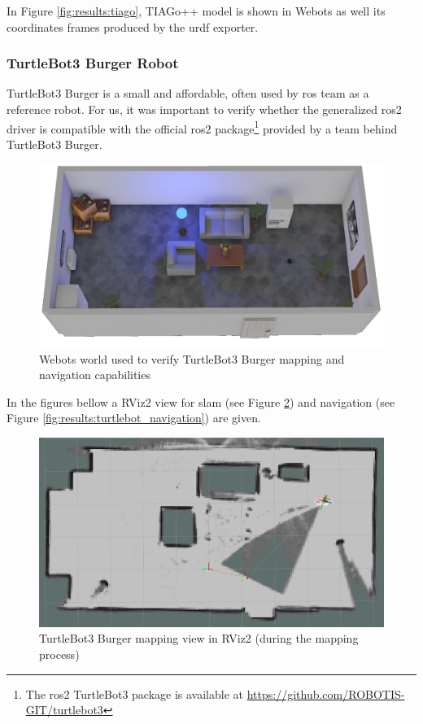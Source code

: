 In Figure \ref{fig:results:tiago}, TIAGo++ model is shown in Webots as well its coordinates frames produced by the \ac{urdf} exporter.

\subsubsection{TurtleBot3 Burger Robot}

TurtleBot3 Burger is a small and affordable, often used by \ac{ros} team as a reference robot.
For us, it was important to verify whether the generalized \ac{ros2} driver is compatible with
the official \ac{ros2} package\footnote{The \ac{ros2} TurtleBot3 package is available at \url{https://github.com/ROBOTIS-GIT/turtlebot3}} provided by a team behind TurtleBot3 Burger.

\begin{figure}[H]
    \centering
    \includegraphics[width=\textwidth]{./results/figures/turtlebot_webots}
    \caption{Webots world used to verify TurtleBot3 Burger mapping and navigation capabilities}
    \label{fig:results:turtlebot_webots}
\end{figure}

In the figures bellow a RViz2 view for \ac{slam} (see Figure \ref{fig:results:turtlebot_mapping}) and navigation (see Figure \ref{fig:results:turtlebot_navigation}) are given.

\begin{figure}[H]
    \centering
    \includegraphics[width=\textwidth]{./results/figures/turtlebot_mapping}
    \caption[TurtleBot3 Burger mapping view in RViz2]{TurtleBot3 Burger mapping view in RViz2 (during the mapping process)}
    \label{fig:results:turtlebot_mapping}
\end{figure}

